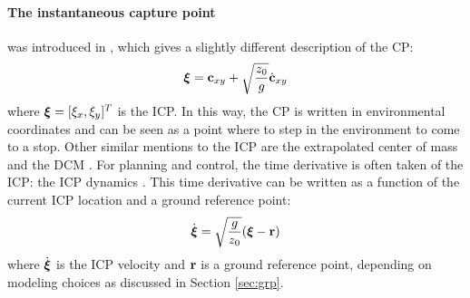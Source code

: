 \paragraph{The instantaneous capture point} was introduced in \cite{koolen2012capturability}, which gives a slightly different description of the \ac{CP}:
\begin{equation}
\boldsymbol{\xi}=\mathbf{c}_{xy}+\sqrt{\frac{z_0}{g}}\dot{\mathbf{c}}_{xy} 
\label{eq:icp}
\end{equation}
where $\boldsymbol{\xi}=[\xi_x, \xi_y]^T$ is the \ac{ICP}. In this way, the \ac{CP} is written in environmental coordinates and can be seen as a point where to step in the environment to come to a stop. Other similar mentions to the \ac{ICP} are the extrapolated center of mass \cite{hof2008extrapolated} and the \ac{DCM} \cite{takenaka2009real}. 
\paraskip
For planning and control, the time derivative is often taken of the \ac{ICP}: the \ac{ICP} dynamics \cite{koolen2012capturability}. This time derivative can be written as a function of the current \ac{ICP} location and a ground reference point:
\begin{equation}\label{eq:icpdyn}
\dot{\boldsymbol{\xi}}=\sqrt{ \frac{g}{z_0}}(\boldsymbol{\xi}-\mathbf{r})
\end{equation}
where $\dot{\boldsymbol{\xi}}$ is the \ac{ICP} velocity and $\mathbf{r}$ is a ground reference point, depending on modeling choices as discussed in Section \ref{sec:grp}.


